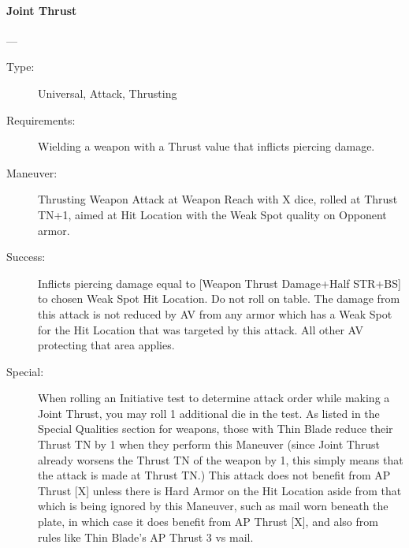 \documentclass[oneside,11pt,english]{book}
\begin{document}
\paragraph{\large\label{man:Joint Thrust}Joint Thrust}---\quad{\large[X+2]}
\vspace{-10pt}\begin{description} 
\item [Type:] Universal, Attack, Thrusting 
\item [Requirements:] Wielding a weapon with a Thrust value that inflicts piercing damage. 
\item [Maneuver:] Thrusting Weapon Attack at Weapon Reach with X dice, rolled at Thrust TN+1, aimed at Hit 
Location with the Weak Spot quality on Opponent armor. 
\item [Success:] Inflicts piercing damage equal to [Weapon Thrust Damage+Half STR+BS] to chosen Weak Spot 
Hit Location. Do not roll on table. The damage from this attack is not reduced by AV from any armor 
which has a Weak Spot for the Hit Location that was targeted by this attack. All other AV protecting that 
area applies. 
\item [Special:] When rolling an Initiative test to determine attack order while making a Joint Thrust, you may 
roll 1 additional die in the test. 
As listed in the Special Qualities section for weapons, those with Thin Blade reduce their Thrust TN by 1 
when they perform this Maneuver (since Joint Thrust already worsens the Thrust TN of the weapon by 1, 
this simply means that the attack is made at Thrust TN.) 
This attack does not benefit from AP Thrust [X] unless there is Hard Armor on the Hit Location aside 
from that which is being ignored by this Maneuver, such as mail worn beneath the plate, in which case it 
does benefit from AP Thrust [X], and also from rules like Thin Blade’s AP Thrust 3 vs mail. 
\end{description}
\end{document}
